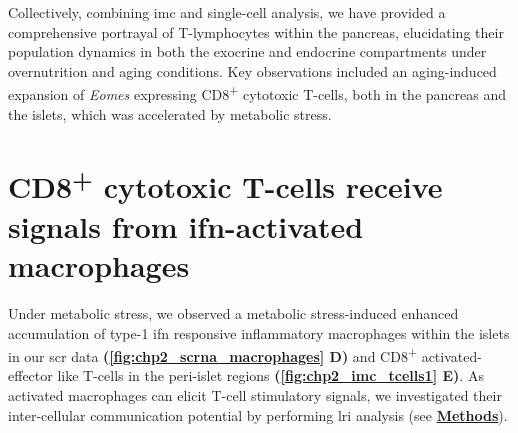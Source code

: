 
\par Collectively, combining \gls{imc} and single-cell analysis, we have provided a comprehensive portrayal of T-lymphocytes within the pancreas, elucidating their population dynamics in both the exocrine and endocrine compartments under overnutrition and aging conditions. Key observations included an aging-induced expansion of \textit{Eomes} expressing CD8\textsuperscript{+} cytotoxic T-cells, both in the pancreas and the islets, which was accelerated by metabolic stress.


\section[CD8\textsuperscript{+} cytotoxic T-cells receive signals from \glslink{ifn}{IFN}-activated macrophages]{CD8\textsuperscript{+} cytotoxic T-cells receive signals from \gls{ifn}-activated\\macrophages}
\label{sec:cell_cell}

Under metabolic stress, we observed a metabolic stress-induced enhanced accumulation of type-1 \gls{ifn} responsive inflammatory macrophages within the islets in our \gls{scr} data \textbf{(\autoref{fig:chp2_scrna_macrophages} D)} and CD8\textsuperscript{+} activated-effector like T-cells in the peri-islet regions \textbf{(\autoref{fig:chp2_imc_tcells1} E)}. As activated macrophages can elicit T-cell stimulatory signals, we investigated their inter-cellular communication potential by performing \acrfull{lri} analysis (see \hyperref[sec:chp2_methods]{\textbf{Methods}}).

